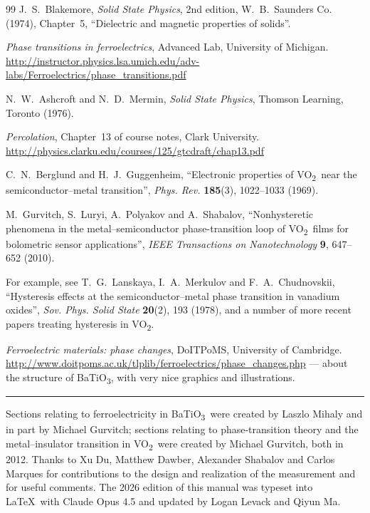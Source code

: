 \documentclass[11pt,a4paper]{article}
\newcommand{\VOtwo}{VO\textsubscript{2}}
\newcommand{\BTO}{BaTiO\textsubscript{3}}
\begin{document}
\begin{thebibliography}{99}
  J.~S.~Blakemore, \emph{Solid State Physics}, 2nd edition,
  W.~B.~Saunders Co. (1974), Chapter~5, ``Dielectric and magnetic properties of
  solids''.

  \emph{Phase transitions in ferroelectrics}, Advanced Lab, University of
  Michigan.
  \url{http://instructor.physics.lsa.umich.edu/adv-labs/Ferroelectrics/phase_transitions.pdf}

  N.~W.~Ashcroft and N.~D.~Mermin, \emph{Solid State Physics},
  Thomson Learning, Toronto (1976).

  \emph{Percolation}, Chapter~13 of course notes, Clark University.
  \url{http://physics.clarku.edu/courses/125/gtcdraft/chap13.pdf}

  C.~N.~Berglund and H.~J.~Guggenheim,
  ``Electronic properties of \VOtwo\ near the semiconductor--metal transition'',
  \emph{Phys. Rev.} \textbf{185}(3), 1022--1033 (1969).

  M.~Gurvitch, S.~Luryi, A.~Polyakov and A.~Shabalov,
  ``Nonhysteretic phenomena in the metal--semiconductor phase-transition loop of
  \VOtwo\ films for bolometric sensor applications'',
  \emph{IEEE Transactions on Nanotechnology} \textbf{9}, 647--652 (2010).

  For example, see T.~G.~Lanskaya, I.~A.~Merkulov and F.~A.~Chudnovskii,
  ``Hysteresis effects at the semiconductor--metal phase transition in vanadium
  oxides'', \emph{Sov. Phys. Solid State} \textbf{20}(2), 193 (1978), and a
  number of more recent papers treating hysteresis in \VOtwo.

  \emph{Ferroelectric materials: phase changes}, DoITPoMS, University of
  Cambridge.
  \url{http://www.doitpoms.ac.uk/tlplib/ferroelectrics/phase_changes.php}
  --- about the structure of \BTO, with very nice graphics and illustrations.

\end{thebibliography}

\bigskip
\noindent\rule{\linewidth}{0.4pt}

\medskip
\noindent\small
Sections relating to ferroelectricity in \BTO\ were created by Laszlo Mihaly and
in part by Michael Gurvitch; sections relating to phase-transition theory and the
metal--insulator transition in \VOtwo\ were created by Michael Gurvitch, both in
2012. Thanks to Xu Du, Matthew Dawber, Alexander Shabalov and Carlos Marques for
contributions to the design and realization of the measurement and for useful
comments. The 2026 edition of this manual was typeset into \LaTeX \ with Claude
Opus 4.5 and updated by Logan Levack and Qiyun Ma.
\end{document}
